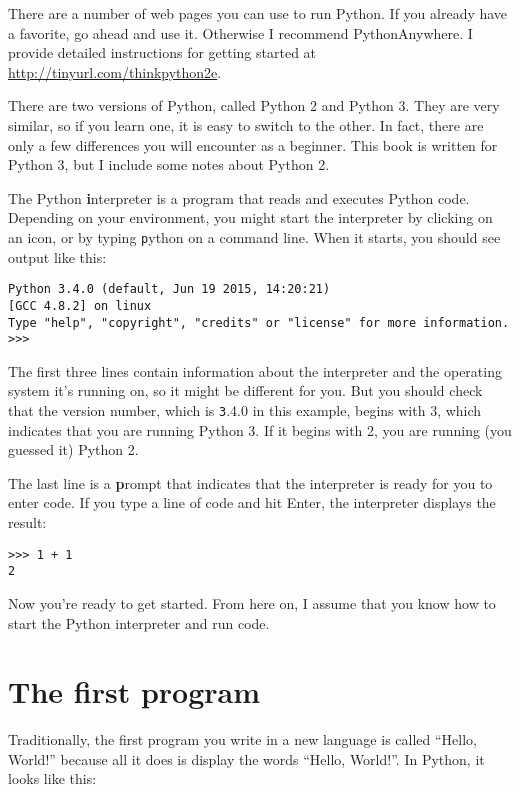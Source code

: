 \documentclass[
DIV=11,
fontsize=13,
twoside,
headinclude=false,
titlepage=firstiscover,
abstract=true,
headsepline=true,
footsepline=true,
chapterprefix=true, %
headings=big,
bibliography=totoc,%
captions=tableheading
]{scrbook}
\theoremstyle{definition}
\begin{document}
There are a number of web pages you can use to run Python.  If you
already have a favorite, go ahead and use it.  Otherwise I recommend
PythonAnywhere.  I provide detailed instructions for getting started
at \url{http://tinyurl.com/thinkpython2e}.  

There are two versions of Python, called Python 2 and Python 3.
They are very similar, so if you learn one, it is easy to switch
to the other.  In fact, there are only a few differences you will
encounter as a beginner.
This book is written for Python 3, but I include some notes
about Python 2.

The Python {\textbf interpreter} is a program that reads and executes
Python code.  Depending on your environment, you might start the
interpreter by clicking on an icon, or by typing {\texttt python} on
a command line. 
When it starts, you should see output like this:

\begin{lstlisting}
Python 3.4.0 (default, Jun 19 2015, 14:20:21) 
[GCC 4.8.2] on linux
Type "help", "copyright", "credits" or "license" for more information.
>>> 
\end{lstlisting}
%
The first three lines contain information about the interpreter
and the operating system it's running on, so it might be different for
you.  But you should check that the version number, which is
{\texttt 3.4.0} in this example, begins with 3, which indicates that
you are running Python 3.  If it begins with 2, you are running
(you guessed it) Python 2.

The last line is a {\textbf prompt} that indicates that the interpreter is
ready for you to enter code.
If you type a line of code and hit Enter, the interpreter displays the
result: 

\begin{lstlisting}
>>> 1 + 1
2
\end{lstlisting}
%
Now you're ready to get started.
From here on, I assume that you know how to start the Python
interpreter and run code.


\section{The first program}
\label{hello}

Traditionally, the first program you write in a new language
is called ``Hello, World!'' because all it does is display the
words ``Hello, World!''.  In Python, it looks like this:
\end{document}
